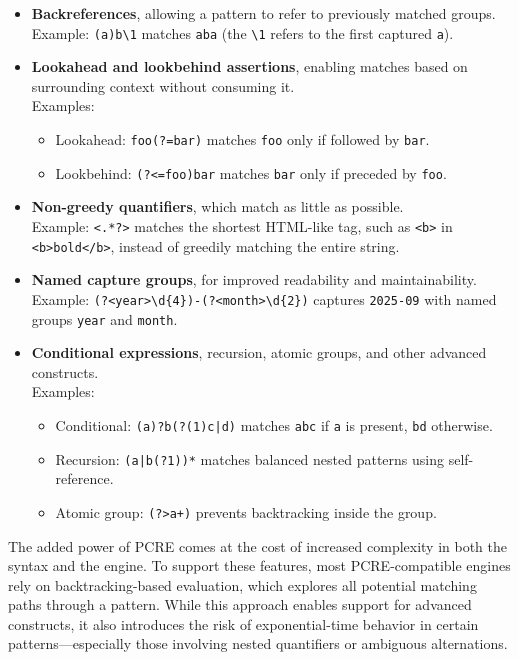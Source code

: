 \begin{itemize}
	\item \textbf{Backreferences}, allowing a pattern to refer to previously matched groups.\\
	Example: \texttt{(a)b\textbackslash1} matches \texttt{aba} (the \texttt{\textbackslash1} refers to the first captured \texttt{a}).
	
	\item \textbf{Lookahead and lookbehind assertions}, enabling matches based on surrounding context without consuming it.\\
	Examples:
	\begin{itemize}
		\item Lookahead: \texttt{foo(?=bar)} matches \texttt{foo} only if followed by \texttt{bar}.
		\item Lookbehind: \texttt{(?<=foo)bar} matches \texttt{bar} only if preceded by \texttt{foo}.
	\end{itemize}
	
	\item \textbf{Non-greedy quantifiers}, which match as little as possible.\\
	Example: \texttt{<.*?>} matches the shortest HTML-like tag, such as \texttt{<b>} in \texttt{<b>bold</b>}, instead of greedily matching the entire string.
	
	\item \textbf{Named capture groups}, for improved readability and maintainability.\\
	Example: \texttt{(?<year>\textbackslash d\{4\})-(?<month>\textbackslash d\{2\})} captures \texttt{2025-09} with named groups \texttt{year} and \texttt{month}.
	
	\item \textbf{Conditional expressions}, recursion, atomic groups, and other advanced constructs.\\
	Examples:
	\begin{itemize}
		\item Conditional: \texttt{(a)?b(?(1)c|d)} matches \texttt{abc} if \texttt{a} is present, \texttt{bd} otherwise.
		\item Recursion: \texttt{(a|b(?1))*} matches balanced nested patterns using self-reference.
		\item Atomic group: \texttt{(?>a+)} prevents backtracking inside the group.
	\end{itemize}
\end{itemize}

The added power of PCRE comes at the cost of increased complexity in both the syntax and the engine. To support these features, most PCRE-compatible engines rely on backtracking-based evaluation, which explores all potential matching paths through a pattern. While this approach enables support for advanced constructs, it also introduces the risk of exponential-time behavior in certain patterns—especially those involving nested quantifiers or ambiguous alternations.

